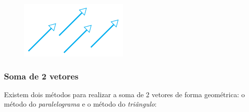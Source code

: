 \documentclass[pdftex, brazil, 12pt, twoside]{article}
\begin{document}
\begin{figure}[H]
  \begin{center}
    \includegraphics[scale=0.6]{imagens/vet003.png}
  \end{center}
\end{figure}

\subsubsection{Soma de 2 vetores}
\label{evd-geom-bi-tri-n-dimen-soma-2}

Existem dois métodos para realizar a soma de 2 vetores de forma geométrica: o método
do \emph{paralelograma} e o método do \emph{triângulo}:
\end{document}
